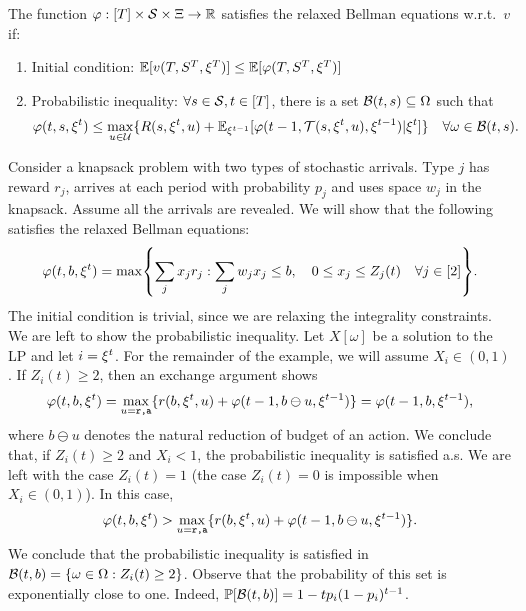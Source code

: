 \begin{definition}
The function $\varphi:[T]\times\S\times\Xi\to \R$ satisfies the relaxed Bellman equations w.r.t.\ $v$ if:
\begin{enumerate}
\item Initial condition: $\E[v(\T,S^\T,\xi^\T)] \leq \E[\varphi(\T,S^\T,\xi^\T)]$
\item Probabilistic inequality: $\forall s\in\S,t\in[T]$, there is a set $\calB(t,s)\subseteq\Omega$ such that
\begin{equation}\label{eq:relaxed_bellman}
\varphi(t,s,\xit) \leq \max_{u\in\U}\crl{R(s,\xit,u)+\E_{\xi^{t-1}}[\varphi(t-1,\Tr(s,\xit,u),\xi^{t-1})|\xit]} \quad \forall \omega\in\calB(t,s).
\end{equation}
\end{enumerate}
\end{definition} 
 
\begin{example}
Consider a knapsack problem with two types of stochastic arrivals.
Type $j$ has reward $r_j$, arrives at each period with probability $p_j$ and uses space $w_j$ in the knapsack.
Assume all the arrivals are revealed.
We will show that the following satisfies the relaxed Bellman equations:
\[
\varphi(t,b,\xit) = \max\crl*{\sum_{j}x_jr_j:\sum_{j}w_jx_j\leq b, \quad 0\leq x_j \leq Z_j(t) \quad \forall j\in[2]}.
\]
The initial condition is trivial, since we are relaxing the integrality constraints.
We are left to show the probabilistic inequality.
Let $X[\omega]$ be a solution to the LP and let $i=\xit$.
For the remainder of the example, we will assume $X_i\in(0,1)$.
If $Z_i(t)\geq 2$,  then an exchange argument shows
\[
\varphi(t,b,\xit) = \max_{u=\texttt{r,a}}\crl{r(b,\xit,u)+\varphi(t-1,b\ominus u,\xi^{t-1})}
= \varphi(t-1,b,\xi^{t-1}),
\]
where $b\ominus u$ denotes the natural reduction of budget of an action.
We conclude that, if $Z_i(t)\geq 2$ and $X_i<1$, the probabilistic inequality is satisfied a.s.
We are left with the case $Z_i(t)=1$ (the case $Z_i(t)=0$ is impossible when $X_i\in (0,1)$).
In this case, 
\[
\varphi(t,b,\xit) > \max_{u=\texttt{r,a}}\crl{r(b,\xit,u)+\varphi(t-1,b\ominus u,\xi^{t-1})}.
\]
We conclude that the probabilistic inequality is satisfied in $\calB(t,b)=\crl{\omega\in\Omega:Z_i(t)\geq 2}$.
Observe that the probability of this set is exponentially close to one.
Indeed, $\Pr[\calB(t,b)]=1-tp_i(1-p_i)^{t-1}$.
\end{example}

